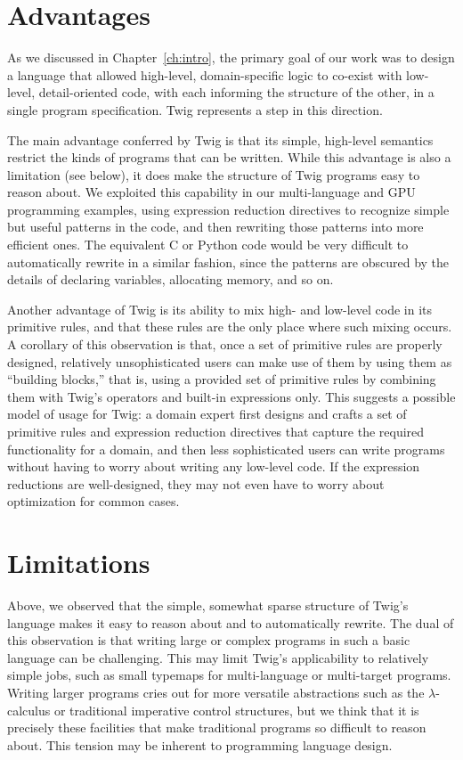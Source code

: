 \section{Advantages}

As we discussed in Chapter~\ref{ch:intro}, the primary goal of our
work was to design a language that allowed high-level,
domain-specific logic to co-exist with low-level, detail-oriented
code, with each informing the structure of the other, in a single
program specification. Twig represents a step in this direction.

The main advantage conferred by Twig is that its simple,
high-level semantics restrict the kinds of programs that can be
written. While this advantage is also a limitation (see below), it
does make the structure of Twig programs easy to reason about. We
exploited this capability in our multi-language and GPU
programming examples, using expression reduction directives to
recognize simple but useful patterns in the code, and then
rewriting those patterns into more efficient ones. The equivalent
C or Python code would be very difficult to automatically rewrite
in a similar fashion, since the patterns are obscured by the
details of declaring variables, allocating memory, and so on.

Another advantage of Twig is its ability to mix high- and
low-level code in its primitive rules, and that these rules are
the only place where such mixing occurs. A corollary of this
observation is that, once a set of primitive rules are properly
designed, relatively unsophisticated users can make use of them by
using them as ``building blocks,'' that is, using a provided set
of primitive rules by combining them with Twig's operators and
built-in expressions only. This suggests a possible model of usage
for Twig: a domain expert first designs and crafts a set of
primitive rules and expression reduction directives that capture
the required functionality for a domain, and then less
sophisticated users can write programs without having to worry
about writing any low-level code. If the expression reductions are
well-designed, they may not even have to worry about optimization
for common cases.

\section{Limitations}

Above, we observed that the simple, somewhat sparse structure of
Twig's language makes it easy to reason about and to automatically
rewrite. The dual of this observation is that writing large or
complex programs in such a basic language can be challenging. This
may limit Twig's applicability to relatively simple jobs, such as
small typemaps for multi-language or multi-target programs.
Writing larger programs cries out for more versatile abstractions
such as the $\lambda$-calculus or traditional imperative control
structures, but we think that it is precisely these facilities
that make traditional programs so difficult to reason about. This
tension may be inherent to programming language design.

